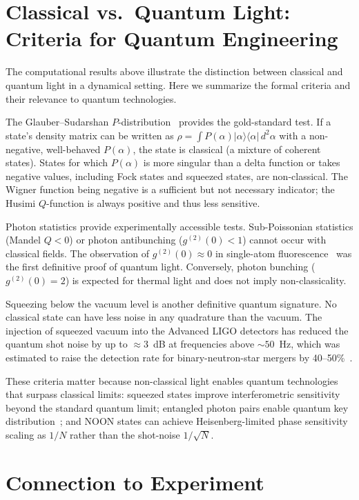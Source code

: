 \documentclass[12pt]{iopart}
\begin{document}
\section{Classical vs.\ Quantum Light: Criteria for Quantum Engineering}
\label{sec:criteria}

The computational results above illustrate the distinction between classical and quantum light in a dynamical setting. Here we summarize the formal criteria and their relevance to quantum technologies.

The Glauber--Sudarshan $P$-distribution~\cite{glauber1963, sudarshan1963} provides the gold-standard test. If a state's density matrix can be written as $\rho = \int P(\alpha) |\alpha\rangle\langle\alpha|\,d^2\alpha$ with a non-negative, well-behaved $P(\alpha)$, the state is classical (a mixture of coherent states). States for which $P(\alpha)$ is more singular than a delta function or takes negative values, including Fock states and squeezed states, are non-classical. The Wigner function being negative is a sufficient but not necessary indicator; the Husimi $Q$-function is always positive and thus less sensitive.

Photon statistics provide experimentally accessible tests. Sub-Poissonian statistics (Mandel $Q < 0$) or photon antibunching ($g^{(2)}(0) < 1$) cannot occur with classical fields. The observation of $g^{(2)}(0) \approx 0$ in single-atom fluorescence~\cite{kimble1977} was the first definitive proof of quantum light. Conversely, photon bunching ($g^{(2)}(0) = 2$) is expected for thermal light and does not imply non-classicality.

Squeezing below the vacuum level is another definitive quantum signature. No classical state can have less noise in any quadrature than the vacuum. The injection of squeezed vacuum into the Advanced LIGO detectors has reduced the quantum shot noise by up to $\approx 3$~dB at frequencies above $\sim 50$~Hz, which was estimated to raise the detection rate for binary-neutron-star mergers by 40--50\%~\cite{tse2019}.

These criteria matter because non-classical light enables quantum technologies that surpass classical limits: squeezed states improve interferometric sensitivity beyond the standard quantum limit; entangled photon pairs enable quantum key distribution~\cite{ekert1991}; and NOON states can achieve Heisenberg-limited phase sensitivity scaling as $1/N$ rather than the shot-noise $1/\sqrt{N}$.


\section{Connection to Experiment}
\label{sec:experiment}
\end{document}
